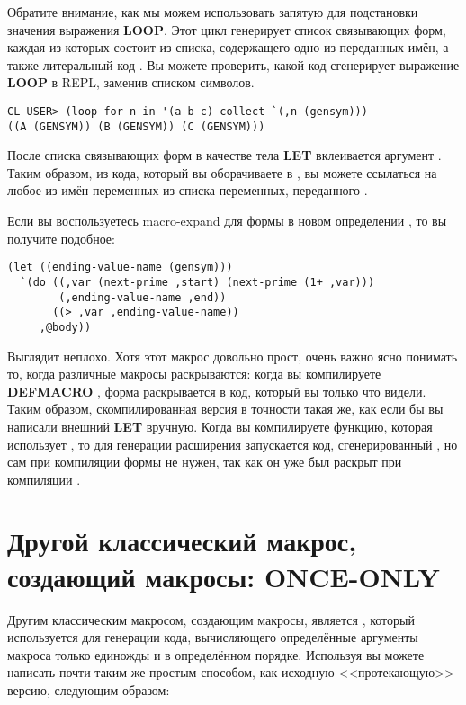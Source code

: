 Обратите внимание, как мы можем использовать запятую для подстановки значения выражения
\textbf{LOOP}. Этот цикл генерирует список связывающих форм, каждая из которых состоит из
списка, содержащего одно из переданных  имён, а также литеральный код
. Вы можете проверить, какой код сгенерирует выражение \textbf{LOOP} в
REPL, заменив  списком символов.

\begin{lstlisting}
CL-USER> (loop for n in '(a b c) collect `(,n (gensym)))
((A (GENSYM)) (B (GENSYM)) (C (GENSYM)))
\end{lstlisting}

После списка связывающих форм в качестве тела \textbf{LET} вклеивается аргумент
 . Таким образом, из кода, который вы оборачиваете в
, вы можете ссылаться на любое из имён переменных из списка переменных,
переданного .

Если вы воспользуетесь macro-expand для формы  в новом определении
, то вы получите подобное:

\begin{lstlisting}
(let ((ending-value-name (gensym)))
  `(do ((,var (next-prime ,start) (next-prime (1+ ,var)))
        (,ending-value-name ,end))
       ((> ,var ,ending-value-name))
     ,@body))
\end{lstlisting}

Выглядит неплохо. Хотя этот макрос довольно прост, очень важно ясно понимать то, когда
различные макросы раскрываются: когда вы компилируете \textbf{DEFMACRO} ,
форма  раскрывается в код, который вы только что видели. Таким образом,
скомпилированная версия  в точности такая же, как если бы вы написали
внешний \textbf{LET} вручную. Когда вы компилируете функцию, которая использует
, то для генерации расширения  запускается код,
сгенерированный , но сам  при компиляции формы
 не нужен, так как он уже был раскрыт при компиляции .


\section{Другой классический макрос, создающий макросы: ONCE-ONLY}

Другим классическим макросом, создающим макросы, является , который
используется для генерации кода, вычисляющего определённые аргументы макроса только
единожды и в определённом порядке. Используя  вы можете написать
 почти таким же простым способом, как исходную <<протекающую>> версию,
следующим образом:

